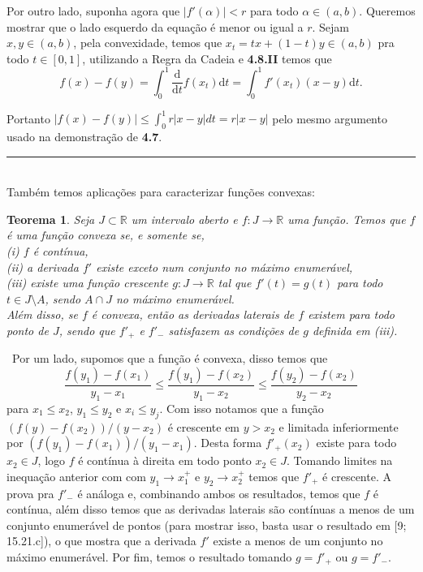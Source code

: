 \documentclass[12pt, a4paper]{article}
\newtheorem{thrm}[mydef]{Teorema}
\def\dem{\par\smallbreak\noindent {\textit{ Demonstração:}} \ }
\def\eop{\hfill\rule{2.5mm}{2.5mm}}
\theoremstyle{definition}
\begin{document}
Por outro lado, suponha agora que $|f'(\alpha)|<r$ para todo $\alpha \in (a,b)$. Queremos mostrar que o lado esquerdo da equação é menor ou igual a $r$. Sejam $x,y\in (a,b)$, pela convexidade, temos que $x_t=tx+(1-t)y\in (a,b)$ pra todo $t\in [0,1]$, utilizando a Regra da Cadeia e \textbf{4.8.II} temos que $$f(x)-f(y)=\int_0^1 \frac{ \text{d}}{ \text{d}t}f(x_t) \text{d}t=\int_0^1 f'(x_t)(x-y) \text{d}t.$$

Portanto $|f(x)-f(y)|\leq \int_0^1 r |x-y|dt=r|x-y|$ pelo mesmo argumento usado na demonstração de \textbf{4.7}. \eop \\

Também temos aplicações para caracterizar funções convexas:

\begin{thrm}
	
	Seja $J\subset \mathbb{R}$ um intervalo aberto e $f:J\rightarrow \mathbb{R}$ uma função. Temos que $f$ é uma função convexa se, e somente se, \\
	
	(i) $f$ é contínua, \\
	
	(ii) a derivada $f'$ existe exceto num conjunto no máximo enumerável, \\
	
	(iii) existe uma função crescente $g:J\rightarrow \mathbb{R}$ tal que $f'(t)=g(t)$ para todo $t\in J\setminus A$, sendo $A\cap J$ no máximo enumerável. \\
	
	Além disso, se $f$ é convexa, então as derivadas laterais de $f$ existem para todo ponto de $J$, sendo que $f'_+$ e $f'_-$ satisfazem as condições de $g$ definida em (iii).
	
\end{thrm}

\dem Por um lado, supomos que a função é convexa, disso temos que $$\frac{f(y_1)-f(x_1)}{y_1-x_1} \leq \frac{f(y_1)-f(x_2)}{y_1-x_2} \leq \frac{f(y_2)-f(x_2)}{y_2-x_2} $$ para $x_1\leq x_2$, $y_1\leq y_2$ e $x_i\leq y_j$. Com isso notamos que a função $(f(y)-f(x_2))/(y-x_2)$ é crescente em $y>x_2$ e limitada inferiormente por $(f(y_1)-f(x_1))/(y_1-x_1)$. Desta forma $f'_+(x_2)$ existe para todo $x_2\in J$, logo $f$ é contínua à direita em todo ponto $x_2\in J$. Tomando limites na inequação anterior com com $y_1\rightarrow x_1^+$ e $y_2\rightarrow x_2^+$ temos que $f'_+$ é crescente. A prova pra $f'_-$ é análoga e, combinando ambos os resultados, temos que $f$ é contínua, além disso temos que as derivadas laterais são contínuas a menos de um conjunto enumerável de pontos (para mostrar isso, basta usar o resultado em [9; 15.21.c]), o que mostra que a derivada $f'$ existe a menos de um conjunto no máximo enumerável. Por fim, temos o resultado tomando $g=f'_+$ ou $g=f'_-$.
\end{document}
